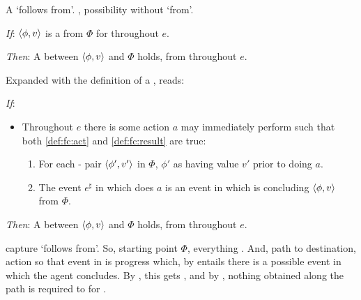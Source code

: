 \begin{note}
  A \ros{} `follows from'.
  \supportII{}, possibility without `from'.

  \begin{idea}[\supportII{}]%
    \label{idea:support:possible}%
    \vspace{-\baselineskip}
    \begin{itenum}
    \item[\emph{If}:]
      \(\langle \phi, v \rangle\) is a  from \(\Phi\) for \vAgent{} throughout \(e\).
    \item[\emph{Then}:]
      A \ros{} between \(\langle \phi, v \rangle\) and \(\Phi\) holds, from  throughout \(e\).
    \end{itenum}
    \vspace{-\baselineskip}
  \end{idea}

  \noindent%
  Expanded with the definition of a \fc{}, \supportII{} reads:
  \begin{itenum}
  \item[\emph{If}:]
    \begin{itemize}
    \item
      Throughout \(e\) there is some action \(a\) \vAgent{} may immediately perform such that both \ref{def:fc:act} and \ref{def:fc:result} are true:
      \begin{enumerate}[label=\alph*., ref=(\alph*)]
      \item
        For each - pair \(\langle \phi', v' \rangle\) in \(\Phi\), \vAgent{} \evals{} \(\phi'\) as having value \(v'\) prior to doing \(a\).

      \item
        The event \(e^{\sharp}\) in which \vAgent{} does \(a\) is an event in which \vAgent{} is concluding \(\langle \phi, v \rangle\) from \(\Phi\).
      \end{enumerate}
    \end{itemize}
  \item[\emph{Then}:]
    A \ros{} between \(\langle \phi, v \rangle\) and \(\Phi\) holds, from  throughout \(e\).
  \end{itenum}

  \noindent%
   capture `follows from'.
  So, starting point \(\Phi\), everything \evaled{}.
  And, path to destination, action so that event in is progress which, by \assuPP{} entails there is a possible event in which the agent concludes.
  By \supportI{}, this gets \ros{}, and by \supportII{}, nothing obtained along the path is required to for \ros{}.


\end{note}
